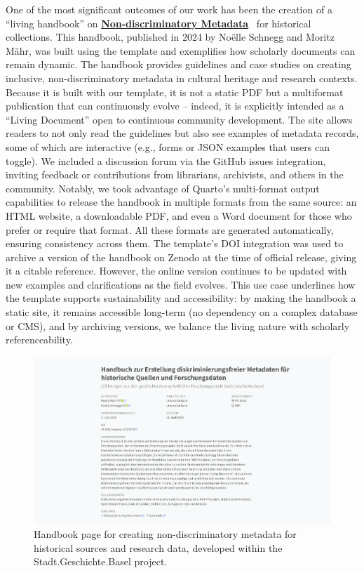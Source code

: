 \documentclass[final]{anthology-ch} %
\begin{document}
One of the most significant outcomes of our work has been the creation of a ``living handbook'' on \href{https://maehr.github.io/diskriminierungsfreie-metadaten/}{\textbf{Non-discriminatory Metadata}}~\cite{maehr2024d} for historical collections. This handbook, published in 2024 by Noëlle Schnegg and Moritz Mähr, was built using the template and exemplifies how scholarly documents can remain dynamic. The handbook provides guidelines and case studies on creating inclusive, non-discriminatory metadata in cultural heritage and research contexts. Because it is built with our template, it is not a static PDF but a multiformat publication that can continuously evolve -- indeed, it is explicitly intended as a ``Living Document'' open to continuous community development. The site allows readers to not only read the guidelines but also see examples of metadata records, some of which are interactive (e.g., forms or JSON examples that users can toggle). We included a discussion forum via the GitHub issues integration, inviting feedback or contributions from librarians, archivists, and others in the community. Notably, we took advantage of Quarto's multi-format output capabilities to release the handbook in multiple formats from the same source: an HTML website, a downloadable PDF, and even a Word document for those who prefer or require that format. All these formats are generated automatically, ensuring consistency across them. The template's DOI integration was used to archive a version of the handbook on Zenodo at the time of official release, giving it a citable reference. However, the online version continues to be updated with new examples and clarifications as the field evolves. This use case underlines how the template supports sustainability and accessibility: by making the handbook a static site, it remains accessible long-term (no dependency on a complex database or CMS), and by archiving versions, we balance the living nature with scholarly referenceability.

\begin{figure}[t!]
  \centering
  \includegraphics[width=0.9\linewidth]{images/diskriminierungsfreie_metadaten.png}
  \caption{Handbook page for creating non-discriminatory metadata for historical sources and research data, developed within the Stadt.Geschichte.Basel project.}
  \label{fig-discriminationfree-metadata}
\end{figure}
\end{document}
